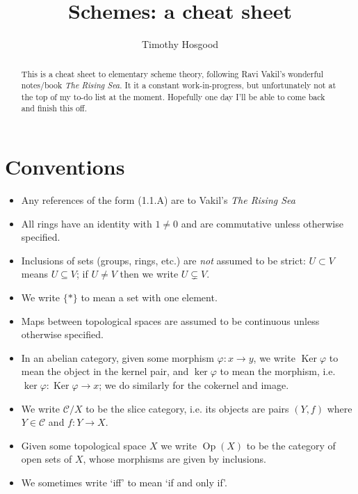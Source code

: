 \documentclass[10pt]{article}
\title{Schemes: a cheat sheet}
\author{Timothy Hosgood}
\DeclareMathOperator{\Op}{Op}
\DeclareMathOperator{\Ker}{Ker}
\newcommand{\ccat}{\mathcal{C}}
\begin{document}
    \maketitle
    \begin{abstract}
        This is a cheat sheet to elementary scheme theory, following Ravi Vakil's wonderful notes/book \emph{The Rising Sea}.
        It it a constant work-in-progress, but unfortunately not at the top of my to-do list at the moment.
        Hopefully one day I'll be able to come back and finish this off.
    \end{abstract}
    \tableofcontents
    
    \section{Conventions}
    
        \begin{itemize}
            \item Any references of the form (1.1.A) are to Vakil's \emph{The Rising Sea}
            \item All rings have an identity with $1\neq0$ and are commutative unless otherwise specified.
            \item Inclusions of sets (groups, rings, etc.) are \textit{not} assumed to be strict: $U\subset V$ means $U\subseteq V$; if $U\neq V$ then we write $U\subsetneq V$.
            \item We write $\{*\}$ to mean a set with one element.
            \item Maps between topological spaces are assumed to be continuous unless otherwise specified.
            \item In an abelian category, given some morphism $\varphi\colon x\to y$, we write $\Ker\varphi$ to mean the object in the kernel pair, and $\ker\varphi$ to mean the morphism, i.e. $\ker\varphi\colon\Ker\varphi\to x$; we do similarly for the cokernel and image.
            \item We write $\ccat/X$ to be the slice category, i.e. its objects are pairs $(Y,f)$ where $Y\in\ccat$ and $f\colon Y\to X$.
            \item Given some topological space $X$ we write $\Op(X)$ to be the category of open sets of $X$, whose morphisms are given by inclusions.
            \item We sometimes write `iff' to mean `if and only if'.
        \end{itemize}
    
\end{document}

